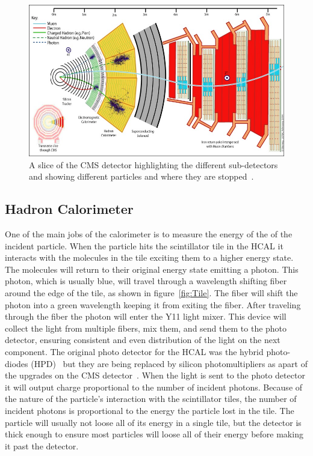 \begin{figure}
\centering
\includegraphics[width=\linewidth]{Figures/CMSlayout.jpg}
\caption{A slice of the CMS detector highlighting the different sub-detectors and showing different particles and where they are stopped~\cite{Davis}.}
\label{fig:CMSlayout}
\end{figure}

\subsection{Hadron Calorimeter}
One of the main jobs of the calorimeter is to measure the energy of the of the incident particle. When the particle hits the scintillator tile in the HCAL it interacts with the molecules in the tile exciting them to a higher energy state. The molecules will return to their original energy state emitting a photon. This photon, which is usually blue, will travel through a wavelength shifting fiber around the edge of the tile, as shown in figure~\ref{fig:Tile}. The fiber will shift the photon into a green wavelength keeping it from exiting the fiber. After traveling through the fiber the photon will enter the Y11 light mixer. This device will collect the light from multiple fibers, mix them, and send them to the photo detector, ensuring consistent and even distribution of the light on the next component. The original photo detector for the HCAL was the hybrid photo-diodes (HPD)~\cite{HPD} but they are being replaced by silicon photomultipliers as apart of the upgrades on the CMS detector~\cite{HCALPhase1}. When the light is sent to the photo detector it will output charge proportional to the number of incident photons. Because of the nature of the particle's interaction with the scintillator tiles, the number of incident photons is proportional to the energy the particle lost in the tile. The particle will usually not loose all of its energy in a single tile, but the detector is thick enough to ensure most particles will loose all of their energy before making it past the detector.

